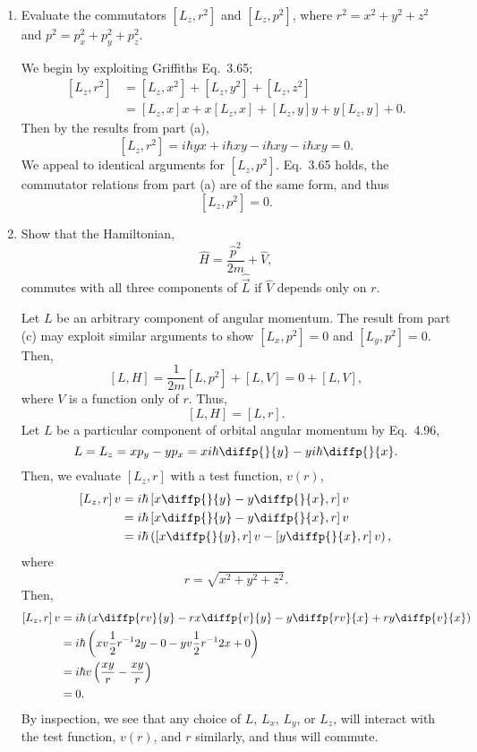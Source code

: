 \documentclass[a4paper, 12pt]{config/homework}
\begin{document}
\begin{enumerate}
\begin{enumerate}[label=(\alph*)]
\bigskip
\item Evaluate the commutators \([L_z, r^2]\) and \([L_z, p^2]\), where \(r^2 = x^2 + y^2 + z^2\) and \(p^2 = p^2_x + p^2_y + p^2_z\). \bigskip

We begin by exploiting Griffiths Eq.\ 3.65;
\begin{align*}
\left[L_z, r^2\right] &= \left[L_z, x^2\right] + \left[L_z, y^2\right] + \left[L_z, z^2\right]
\\&= \left[L_z, x\right]x + x\left[L_z, x\right] + \left[L_z, y\right]y + y\left[L_z, y\right] + 0.
\end{align*}
Then by the results from part (a),
\[\left[L_z, r^2\right] = i\hbar yx + i\hbar xy -i\hbar xy - i\hbar xy = 0.\]
We appeal to identical arguments for \(\left[L_z, p^2\right]\). Eq.\ 3.65 holds, the commutator relations from part (a) are of the same form, and thus
\[\left[L_z, p^2\right] = 0.\]

\bigskip
\item Show that the Hamiltonian, \[\hat{H}=\frac{\hat{p}^2}{2m} + \hat{V},\] commutes with all three components of \(\hat{\vec{L}}\) if \(\hat{V}\) depends only on \(r\). \bigskip

Let \(L\) be an arbitrary component of angular momentum. The result from part (c) may exploit similar arguments to show \(\left[L_x,p^2\right]=0\) and \(\left[L_y, p^2\right]=0\). Then,
\[\left[L, H\right] = \frac{1}{2m}\left[L, p^2\right] + \left[L, V\right] = 0 + \left[L, V\right],\]
where \(V\) is a function only of \(r\). Thus,
\[\left[L,H\right] = \left[L,r\right].\]
Let \(L\) be a particular component of orbital angular momentum by Eq.\ 4.96,
\[L=L_z=xp_y-yp_x=xi\hbar\diffp{}{y} - yi\hbar\diffp{}{x}.\]
Then, we evaluate \(\left[L_z,r\right]\) with a test function, \(v(r)\),
\begin{align*}
\left[L_z,r\right]v &= i\hbar\left[x\diffp{}{y}-y\diffp{}{x},r\right]v
\\&= i\hbar\left[x\diffp{}{y}-y\diffp{}{x},r\right]v
\\&= i\hbar\left(\left[x\diffp{}{y},r\right]v - \left[y\diffp{}{x},r\right]v\right),
\end{align*}
where
\[r = \sqrt{x^2 + y^2 + z^2}.\]
Then,
\begin{align*}
\left[L_z, r\right]v &= i\hbar\left(x\diffp{rv}{y}-rx\diffp{v}{y} - y\diffp{rv}{x} + ry\diffp{v}{x}\right)
\\&= i\hbar \left(xv\frac{1}{2}r^{-1}2y - 0 -yv\frac{1}{2}r^{-1}2x + 0\right)
\\&= i\hbar v\left(\frac{xy}{r}-\frac{xy}{r}\right)
\\&= 0.
\end{align*}
By inspection, we see that any choice of \(L\), \(L_x\), \(L_y\), or \(L_z\), will interact with the test function, \(v(r)\), and \(r\) similarly, and thus will commute.

\end{enumerate}
\end{enumerate}
\end{document}
